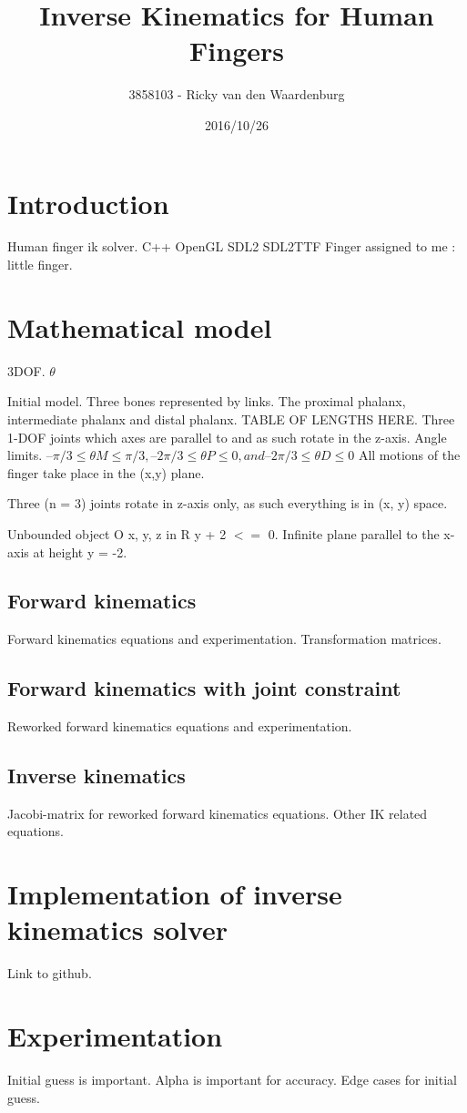 \documentclass{article}
\title{Inverse Kinematics for Human Fingers}
\date{2016/10/26}
\author{3858103 - Ricky van den Waardenburg}
\begin{document}
\maketitle
\newpage

\section{Introduction}

Human finger ik solver. C++ OpenGL SDL2 SDL2TTF Finger assigned to me : little finger.

\section{Mathematical model}

3DOF. $\theta$

Initial model. Three bones represented by links. The proximal phalanx, intermediate phalanx and distal phalanx. TABLE OF LENGTHS HERE.
Three 1-DOF joints which axes are parallel to and as such rotate in the z-axis. Angle limits.
$ – \pi / 3 ≤ \theta M ≤ \pi / 3, –2 \pi / 3 ≤ \theta P ≤ 0, and –2 \pi / 3 ≤ \theta D ≤ 0$
All motions of the finger take place in the (x,y) plane.

Three (n = 3) joints rotate in z-axis only, as such everything is in (x, y) space.

Unbounded object O x, y, z in R y + 2 $<=$ 0. Infinite plane parallel to the x-axis at height y = -2.

\subsection{Forward kinematics}

Forward kinematics equations and experimentation. Transformation matrices.

\subsection{Forward kinematics with joint constraint}

Reworked forward kinematics equations and experimentation.

\subsection{Inverse kinematics}

Jacobi-matrix for reworked forward kinematics equations. Other IK related equations.

\section{Implementation of inverse kinematics solver}

Link to github.

\section{Experimentation}

Initial guess is important. Alpha is important for accuracy. Edge cases for initial guess.  
\end{document}
